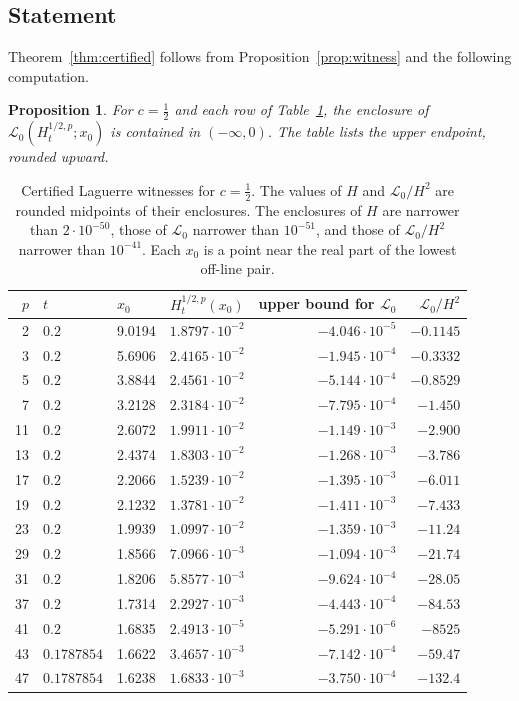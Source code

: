 \documentclass[11pt]{article}
\numberwithin{equation}{section}
\newtheorem{proposition}[theorem]{Proposition}
\theoremstyle{definition}
\theoremstyle{remark}
\newcommand{\Lag}{\mathscr L_0}
\begin{document}
\subsection{Statement}
Theorem~\ref{thm:certified} follows from Proposition~\ref{prop:witness} and
the following computation.

\begin{proposition}\label{prop:table}
For $c=\tfrac12$ and each row of Table~\ref{tab:certified}, the enclosure of
$\Lag(H^{1/2,p}_t;x_0)$ is contained in $(-\infty,0)$. The table lists the
upper endpoint, rounded upward.
\end{proposition}

\begin{table}[ht]
\centering
\begin{tabular}{rllrrr}
\toprule
$p$ & $t$ & $x_0$ & $H^{1/2,p}_t(x_0)$ & upper bound for $\Lag$ & $\Lag/H^2$ \\
\midrule
2 & $0.2$ & 9.0194 & $1.8797\cdot10^{-2}$ & $-4.046\cdot10^{-5}$ & $-0.1145$ \\
3 & $0.2$ & 5.6906 & $2.4165\cdot10^{-2}$ & $-1.945\cdot10^{-4}$ & $-0.3332$ \\
5 & $0.2$ & 3.8844 & $2.4561\cdot10^{-2}$ & $-5.144\cdot10^{-4}$ & $-0.8529$ \\
7 & $0.2$ & 3.2128 & $2.3184\cdot10^{-2}$ & $-7.795\cdot10^{-4}$ & $-1.450$ \\
11 & $0.2$ & 2.6072 & $1.9911\cdot10^{-2}$ & $-1.149\cdot10^{-3}$ & $-2.900$ \\
13 & $0.2$ & 2.4374 & $1.8303\cdot10^{-2}$ & $-1.268\cdot10^{-3}$ & $-3.786$ \\
17 & $0.2$ & 2.2066 & $1.5239\cdot10^{-2}$ & $-1.395\cdot10^{-3}$ & $-6.011$ \\
19 & $0.2$ & 2.1232 & $1.3781\cdot10^{-2}$ & $-1.411\cdot10^{-3}$ & $-7.433$ \\
23 & $0.2$ & 1.9939 & $1.0997\cdot10^{-2}$ & $-1.359\cdot10^{-3}$ & $-11.24$ \\
29 & $0.2$ & 1.8566 & $7.0966\cdot10^{-3}$ & $-1.094\cdot10^{-3}$ & $-21.74$ \\
31 & $0.2$ & 1.8206 & $5.8577\cdot10^{-3}$ & $-9.624\cdot10^{-4}$ & $-28.05$ \\
37 & $0.2$ & 1.7314 & $2.2927\cdot10^{-3}$ & $-4.443\cdot10^{-4}$ & $-84.53$ \\
41 & $0.2$ & 1.6835 & $2.4913\cdot10^{-5}$ & $-5.291\cdot10^{-6}$ & $-8525$ \\
43 & $0.1787854$ & 1.6622 & $3.4657\cdot10^{-3}$ & $-7.142\cdot10^{-4}$ & $-59.47$ \\
47 & $0.1787854$ & 1.6238 & $1.6833\cdot10^{-3}$ & $-3.750\cdot10^{-4}$ & $-132.4$ \\
\bottomrule
\end{tabular}
\caption{Certified Laguerre witnesses for $c=\tfrac12$. The values of $H$
and $\Lag/H^2$ are rounded midpoints of their enclosures. The enclosures
of $H$ are narrower than $2\cdot10^{-50}$, those of $\Lag$ narrower than
$10^{-51}$, and those of $\Lag/H^2$ narrower than $10^{-41}$. Each $x_0$ is
a point near the real part of the lowest off-line pair.}
\label{tab:certified}
\end{table}
\end{document}
